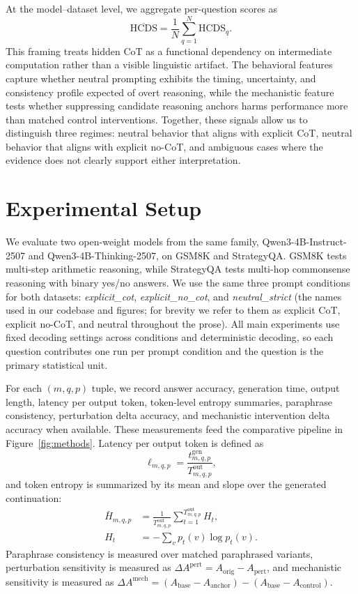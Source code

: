 \documentclass{article}
\theoremstyle{plain}
\theoremstyle{definition}
\theoremstyle{remark}
\begin{document}
At the model--dataset level, we aggregate per-question scores as
\begin{equation}
\overline{\mathrm{HCDS}} = \frac{1}{N}\sum_{q=1}^{N} \mathrm{HCDS}_q.
\label{eq:hcds-mean}
\end{equation}
This framing treats hidden CoT as a functional dependency on intermediate computation rather than a visible linguistic artifact. The behavioral features capture whether neutral prompting exhibits the timing, uncertainty, and consistency profile expected of overt reasoning, while the mechanistic feature tests whether suppressing candidate reasoning anchors harms performance more than matched control interventions. Together, these signals allow us to distinguish three regimes: neutral behavior that aligns with explicit CoT, neutral behavior that aligns with explicit no-CoT, and ambiguous cases where the evidence does not clearly support either interpretation.

\section{Experimental Setup}

We evaluate two open-weight models from the same family, Qwen3-4B-Instruct-2507 and Qwen3-4B-Thinking-2507, on GSM8K and StrategyQA. GSM8K tests multi-step arithmetic reasoning, while StrategyQA tests multi-hop commonsense reasoning with binary yes/no answers. We use the same three prompt conditions for both datasets: \textit{explicit\_cot}, \textit{explicit\_no\_cot}, and \textit{neutral\_strict} (the names used in our codebase and figures; for brevity we refer to them as explicit CoT, explicit no-CoT, and neutral throughout the prose). All main experiments use fixed decoding settings across conditions and deterministic decoding, so each question contributes one run per prompt condition and the question is the primary statistical unit.

For each $(m,q,p)$ tuple, we record answer accuracy, generation time, output length, latency per output token, token-level entropy summaries, paraphrase consistency, perturbation delta accuracy, and mechanistic intervention delta accuracy when available. These measurements feed the comparative pipeline in Figure~\ref{fig:methods}. Latency per output token is defined as
\[
\ell_{m,q,p} = \frac{t^{\mathrm{gen}}_{m,q,p}}{T^{\mathrm{out}}_{m,q,p}},
\]
and token entropy is summarized by its mean and slope over the generated continuation:
\[
\begin{aligned}
\bar{H}_{m,q,p}
&=
\frac{1}{T^{\mathrm{out}}_{m,q,p}}
\sum_{t=1}^{T^{\mathrm{out}}_{m,q,p}}
H_t,
\\
H_t
&= -\sum_{v} p_t(v)\log p_t(v).
\end{aligned}
\]
Paraphrase consistency is measured over matched paraphrased variants, perturbation sensitivity is measured as $\Delta A^{\mathrm{pert}} = A_{\mathrm{orig}} - A_{\mathrm{pert}}$, and mechanistic sensitivity is measured as $\Delta A^{\mathrm{mech}} = (A_{\mathrm{base}} - A_{\mathrm{anchor}}) - (A_{\mathrm{base}} - A_{\mathrm{control}})$.
\end{document}
